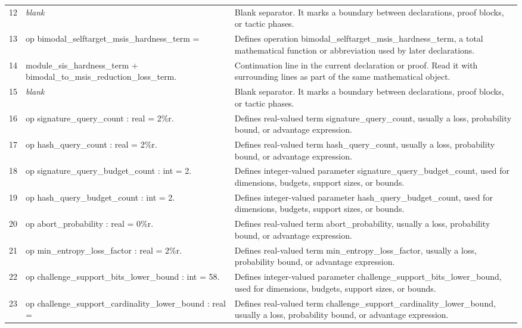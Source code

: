 \documentclass[10pt]{article}
\begin{document}
\begin{longtable}{r L{0.53\textwidth} L{0.37\textwidth}}
12 & {\ttfamily\scriptsize \emph{blank}} & Blank separator.  It marks a boundary between declarations, proof blocks, or tactic phases. \\
13 & {\ttfamily\scriptsize op bimodal\_selftarget\_msis\_hardness\_term =} & Defines operation bimodal\_selftarget\_msis\_hardness\_term, a total mathematical function or abbreviation used by later declarations. \\
14 & {\ttfamily\scriptsize   module\_sis\_hardness\_term + bimodal\_to\_msis\_reduction\_loss\_term.} & Continuation line in the current declaration or proof.  Read it with surrounding lines as part of the same mathematical object. \\
15 & {\ttfamily\scriptsize \emph{blank}} & Blank separator.  It marks a boundary between declarations, proof blocks, or tactic phases. \\
16 & {\ttfamily\scriptsize op signature\_query\_count : real = 2\%r.} & Defines real-valued term signature\_query\_count, usually a loss, probability bound, or advantage expression. \\
17 & {\ttfamily\scriptsize op hash\_query\_count : real = 2\%r.} & Defines real-valued term hash\_query\_count, usually a loss, probability bound, or advantage expression. \\
18 & {\ttfamily\scriptsize op signature\_query\_budget\_count : int = 2.} & Defines integer-valued parameter signature\_query\_budget\_count, used for dimensions, budgets, support sizes, or bounds. \\
19 & {\ttfamily\scriptsize op hash\_query\_budget\_count : int = 2.} & Defines integer-valued parameter hash\_query\_budget\_count, used for dimensions, budgets, support sizes, or bounds. \\
20 & {\ttfamily\scriptsize op abort\_probability : real = 0\%r.} & Defines real-valued term abort\_probability, usually a loss, probability bound, or advantage expression. \\
21 & {\ttfamily\scriptsize op min\_entropy\_loss\_factor : real = 2\%r.} & Defines real-valued term min\_entropy\_loss\_factor, usually a loss, probability bound, or advantage expression. \\
22 & {\ttfamily\scriptsize op challenge\_support\_bits\_lower\_bound : int = 58.} & Defines integer-valued parameter challenge\_support\_bits\_lower\_bound, used for dimensions, budgets, support sizes, or bounds. \\
23 & {\ttfamily\scriptsize op challenge\_support\_cardinality\_lower\_bound : real =} & Defines real-valued term challenge\_support\_cardinality\_lower\_bound, usually a loss, probability bound, or advantage expression. \\

\end{longtable}
\end{document}
